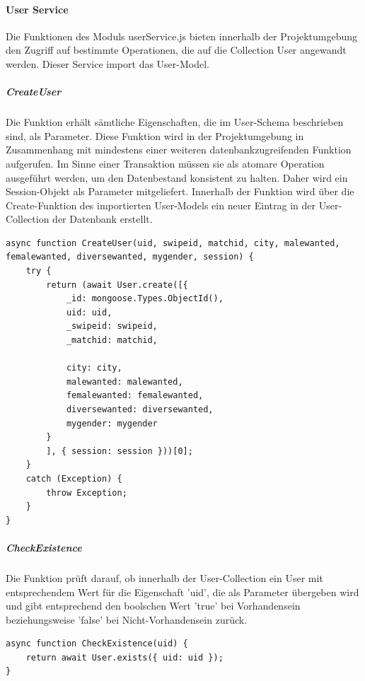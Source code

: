 %
%

\paragraph{User Service}
Die Funktionen des Moduls userService.js bieten innerhalb der Projektumgebung den Zugriff auf bestimmte Operationen, die auf die Collection User angewandt werden. Dieser Service import das User-Model.

\subparagraph{CreateUser}
Die Funktion erhält sämtliche Eigenschaften, die im User-Schema beschrieben sind, als Parameter. Diese Funktion wird in der Projektumgebung in Zusammenhang mit mindestens einer weiteren datenbankzugreifenden Funktion aufgerufen. Im Sinne einer Transaktion müssen sie als atomare Operation ausgeführt werden, um den Datenbestand konsistent zu halten. Daher wird ein Session-Objekt als Parameter mitgeliefert. Innerhalb der Funktion wird über die Create-Funktion des importierten User-Models ein neuer Eintrag in der User-Collection der Datenbank erstellt.

\begin{lstlisting}[caption=User Service - CreateUser, label=lst:userservicecreateuser]
async function CreateUser(uid, swipeid, matchid, city, malewanted, femalewanted, diversewanted, mygender, session) {
    try {
        return (await User.create([{
            _id: mongoose.Types.ObjectId(),
            uid: uid,
            _swipeid: swipeid,
            _matchid: matchid,

            city: city,
            malewanted: malewanted,
            femalewanted: femalewanted,
            diversewanted: diversewanted,
            mygender: mygender
        }
        ], { session: session }))[0];
    }
    catch (Exception) {
        throw Exception;
    }
}
\end{lstlisting}

\subparagraph{CheckExistence}
Die Funktion prüft darauf, ob innerhalb der User-Collection ein User mit entsprechendem Wert für die Eigenschaft 'uid', die als Parameter übergeben wird und gibt entsprechend den boolschen Wert 'true' bei Vorhandensein beziehungsweise 'false' bei Nicht-Vorhandensein zurück.

\begin{lstlisting}[caption=User Service - CheckExistence, label=lst:userservicecheckexistence]
async function CheckExistence(uid) {
    return await User.exists({ uid: uid });
}
\end{lstlisting}

